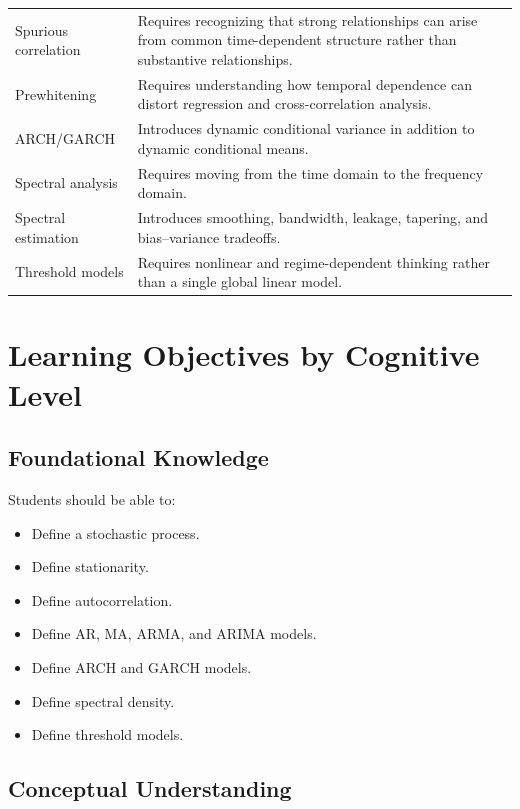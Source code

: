 \documentclass[11pt,a4paper]{article}
\begin{document}
\begin{longtable}{p{}p{}}
Spurious correlation &
Requires recognizing that strong relationships can arise from common
time-dependent structure rather than substantive relationships. \\

Prewhitening &
Requires understanding how temporal dependence can distort regression and
cross-correlation analysis. \\

ARCH/GARCH &
Introduces dynamic conditional variance in addition to dynamic conditional
means. \\

Spectral analysis &
Requires moving from the time domain to the frequency domain. \\

Spectral estimation &
Introduces smoothing, bandwidth, leakage, tapering, and bias--variance
tradeoffs. \\

Threshold models &
Requires nonlinear and regime-dependent thinking rather than a single global
linear model. \\
\bottomrule
\end{longtable}

\section{Learning Objectives by Cognitive Level}

\subsection{Foundational Knowledge}

Students should be able to:

\begin{itemize}
    \item Define a stochastic process.
    \item Define stationarity.
    \item Define autocorrelation.
    \item Define AR, MA, ARMA, and ARIMA models.
    \item Define ARCH and GARCH models.
    \item Define spectral density.
    \item Define threshold models.
\end{itemize}

\subsection{Conceptual Understanding}
\end{document}
